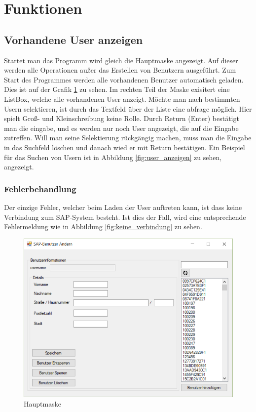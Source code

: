 \section{Funktionen}

\subsection{Vorhandene User anzeigen}

Startet man das Programm wird gleich die Hauptmaske angezeigt. Auf dieser werden alle Operationen außer das Erstellen von Benutzern ausgeführt. 
Zum Start des Programmes werden alle vorhandenen Benutzer automatisch geladen. Dies ist auf der Grafik \ref{fig:main} zu sehen. Im rechten Teil der Maske exisitert eine ListBox, welche alle vorhandenen User anzeigt. 
Möchte man nach bestimmten Usern selektieren, ist durch das Textfeld über der Liste eine abfrage möglich. Hier spielt Groß- und Kleinschreibung keine Rolle. 
Durch Return (Enter) bestätigt man die eingabe, und es werden nur noch User angezeigt, die auf die Eingabe zutreffen. Will man seine Selektierung rückgängig machen, muss man die Eingabe in das Suchfeld löschen und danach wied er mit Return bestätigen.
Ein Beispiel für das Suchen von Usern ist in Abbildung \ref{fig:user_anzeigen} zu sehen, angezeigt.

\subsubsection{Fehlerbehandlung}

Der einzige Fehler, welcher beim Laden der User auftreten kann, ist dass keine Verbindung zum SAP-System besteht. Ist dies der Fall, wird eine entsprechende Fehlermeldung wie in Abbildung \ref{fig:keine_verbindung} zu sehen.

\begin{figure}[h]
	\begin{center}
		\includegraphics[width=\textwidth]{images/Main.png}
	\end{center}
	\caption{Hauptmaske}
	\label{fig:main}
\end{figure}

